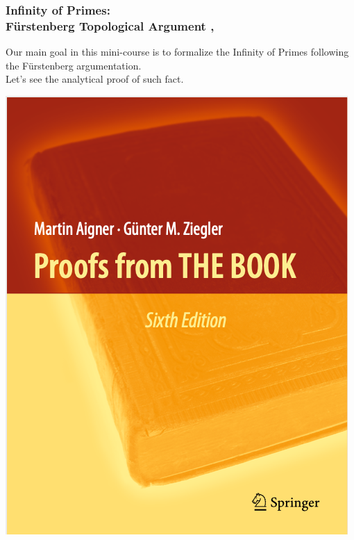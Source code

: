 \documentclass[10pt]{beamer}
\begin{document}
\begin{frame}
\frametitle{Infinity of Primes: \\ F\"{u}rstenberg Topological Argument \cite{Furstenberg1955}, \cite{theBook2018}} 
   \begin{center}
     Our main goal in this mini-course is to formalize the Infinity of Primes following the F\"{u}rstenberg argumentation. \\
\vspace{1cm}
     Let's see the analytical proof of such fact. 
     \begin{center}
\includegraphics[scale=.15]{capa_from_the_book.png}
\end{center}
     \end{center}
 \end{frame}  
\end{document}
